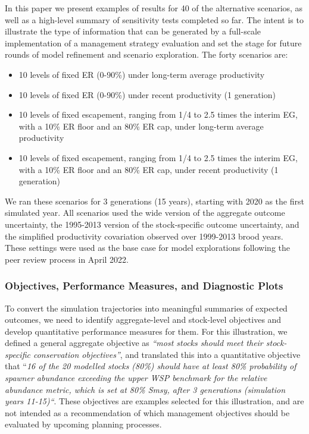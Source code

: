 \documentclass[french,11pt]{book}
\begin{document}
In this paper we present examples of results for 40 of the alternative scenarios, as well as a high-level summary of sensitivity tests completed so far. The intent is to illustrate the type of information that can be generated by a full-scale implementation of a management strategy evaluation and set the stage for future rounds of model refinement and scenario exploration. The forty scenarios are:
\begin{itemize}

\item
  10 levels of fixed ER (0-90\%) under long-term average productivity
\item
  10 levels of fixed ER (0-90\%) under recent productivity (1 generation)
\item
  10 levels of fixed escapement, ranging from 1/4 to 2.5 times the interim EG, with a 10\% ER floor and an 80\% ER cap, under long-term average productivity
\item
  10 levels of fixed escapement, ranging from 1/4 to 2.5 times the interim EG, with a 10\% ER floor and an 80\% ER cap, under recent productivity (1 generation)
\end{itemize}
We ran these scenarios for 3 generations (15 years), starting with 2020 as the first simulated year. All scenarios used the wide version of the aggregate outcome uncertainty, the 1995-2013 version of the stock-specific outcome uncertainty, and the simplified productivity covariation observed over 1999-2013 brood years. These settings were used as the base case for model explorations following the peer review process in April 2022.

\subsubsection{Objectives, Performance Measures, and Diagnostic Plots}\label{objectives-performance-measures-and-diagnostic-plots}

To convert the simulation trajectories into meaningful summaries of expected outcomes, we need to identify aggregate-level and stock-level objectives and develop quantitative performance measures for them. For this illustration, we defined a general aggregate objective as \emph{``most stocks should meet their stock-specific conservation objectives''}, and translated this into a quantitative objective that ``\emph{16 of the 20 modelled stocks (80\%) should have at least 80\% probability of spawner abundance exceeding the upper WSP benchmark for the relative abundance metric, which is set at 80\% Smsy, after 3 generations (simulation years 11-15)``}. These objectives are examples selected for this illustration, and are not intended as a recommendation of which management objectives should be evaluated by upcoming planning processes.
\end{document}
